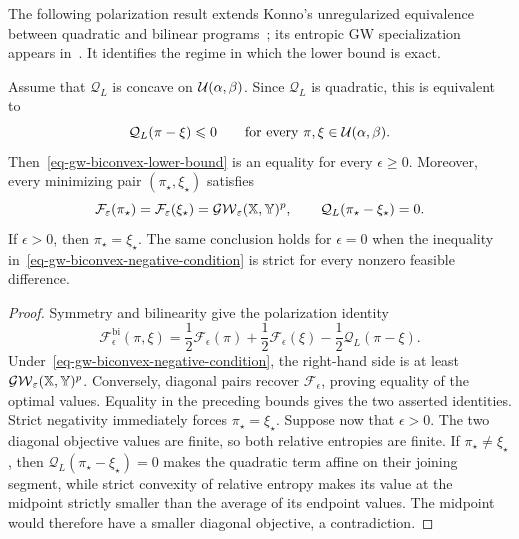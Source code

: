 The following polarization result extends Konno's unregularized equivalence between quadratic and bilinear programs~\cite{Konno1976}; its entropic GW specialization appears in~\cite{SejourneVialardPeyre2021}. It identifies the regime in which the lower bound is exact.

\begin{prop}\label{prop-gw-biconvex-tightness}
	Assume that $\mathcal Q_L$ is concave on $\mathcal{U}(\alpha,\beta)$. Since $\mathcal Q_L$ is quadratic, this is equivalent to
	\begin{equation}\label{eq-gw-biconvex-negative-condition}
		\mathcal Q_L(\pi-\xi)\leqslant0
		\qquad
		\text{for every }\pi,\xi\in\mathcal{U}(\alpha,\beta).
	\end{equation}
	Then~\eqref{eq-gw-biconvex-lower-bound} is an equality for every $\epsilon\geq0$. Moreover, every minimizing pair $(\pi_\star,\xi_\star)$ satisfies
	\[
		\mathcal F_\varepsilon(\pi_\star)
		=
		\mathcal F_\varepsilon(\xi_\star)
		=
		\operatorname{\mathcal{GW}}_\varepsilon(\mathbb{X},\mathbb{Y})^p,
		\qquad
		\mathcal Q_L(\pi_\star-\xi_\star)=0.
	\]
	If $\epsilon>0$, then $\pi_\star=\xi_\star$. The same conclusion holds for $\epsilon=0$ when the inequality in~\eqref{eq-gw-biconvex-negative-condition} is strict for every nonzero feasible difference.
\end{prop}
\begin{proof}
	Symmetry and bilinearity give the polarization identity
	\begin{equation}\label{eq-gw-biconvex-polarization}
		\mathcal F_\epsilon^{\mathrm{bi}}(\pi,\xi)
		=
		\frac12\mathcal F_\epsilon(\pi)
		+
		\frac12\mathcal F_\epsilon(\xi)
		-
		\frac12\mathcal Q_L(\pi-\xi).
	\end{equation}
		Under~\eqref{eq-gw-biconvex-negative-condition}, the right-hand side is at least $\operatorname{\mathcal{GW}}_\varepsilon(\mathbb{X},\mathbb{Y})^p$. Conversely, diagonal pairs recover $\mathcal F_\epsilon$, proving equality of the optimal values. Equality in the preceding bounds gives the two asserted identities. Strict negativity immediately forces $\pi_\star=\xi_\star$. Suppose now that $\epsilon>0$. The two diagonal objective values are finite, so both relative entropies are finite. If $\pi_\star\ne\xi_\star$, then $\mathcal Q_L(\pi_\star-\xi_\star)=0$ makes the quadratic term affine on their joining segment, while strict convexity of relative entropy makes its value at the midpoint strictly smaller than the average of its endpoint values. The midpoint would therefore have a smaller diagonal objective, a contradiction.
\end{proof}

